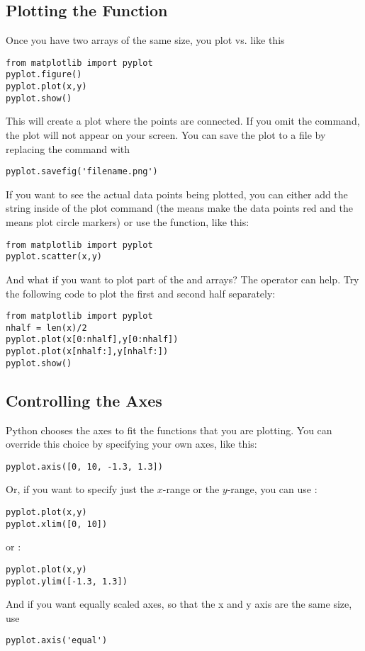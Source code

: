 \subsection*{Plotting the Function}
Once you have two arrays of the same size, you plot  vs.
 like this
\begin{Verbatim}
from matplotlib import pyplot
pyplot.figure()
pyplot.plot(x,y)
pyplot.show()
\end{Verbatim}
This will create a plot where the points are connected.  If you omit
the  command, the plot will not appear on your
screen.  You can save the plot to a file by replacing the
  command with
\begin{Verbatim}
pyplot.savefig('filename.png')
\end{Verbatim}
If you want to see the actual data points being plotted, you
can either add the string  inside of the plot command (the 
means make the data points red and the  means plot circle markers) or use the
 function, like this:
\begin{Verbatim}
from matplotlib import pyplot
pyplot.scatter(x,y)
\end{Verbatim}

 And what if you want to plot part
of the  and  arrays? The  operator can
help.  Try the following code to plot the first and second half
separately:
\begin{Verbatim}
from matplotlib import pyplot
nhalf = len(x)/2
pyplot.plot(x[0:nhalf],y[0:nhalf])
pyplot.plot(x[nhalf:],y[nhalf:])
pyplot.show()
\end{Verbatim}

\subsection*{Controlling the Axes}
\label{sec:Axes}
 Python chooses the axes to fit the functions
that you are plotting. You can override this choice by specifying
your own axes, like this:
\begin{Verbatim}
pyplot.axis([0, 10, -1.3, 1.3])
\end{Verbatim}
  Or, if you want to specify just the
$x$-range or the $y$-range, you can use :
\begin{Verbatim}
pyplot.plot(x,y)
pyplot.xlim([0, 10])
\end{Verbatim}
or :
\begin{Verbatim}
pyplot.plot(x,y)
pyplot.ylim([-1.3, 1.3])
\end{Verbatim}
And if you want equally scaled axes, so that the x and y axis are the same size, use
\begin{Verbatim}
pyplot.axis('equal')
\end{Verbatim}
 


